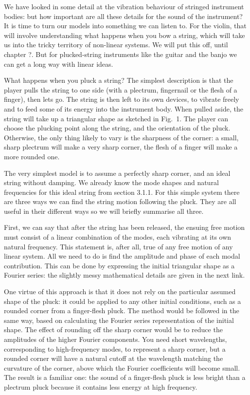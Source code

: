 

  We have looked in some detail at the vibration behaviour of stringed 
  instrument bodies: but how important are all these details for the sound of 
  the instrument? It is time to turn our models into something we can listen 
  to. For the violin, that will involve understanding what happens when you bow 
  a string, which will take us into the tricky territory of non-linear systems. 
  We will put this off, until chapter ?. But for plucked-string instruments 
  like the guitar and the banjo we can get a long way with linear ideas. 

  What happens when you pluck a string? The simplest description is that the 
  player pulls the string to one side (with a plectrum, fingernail or the flesh 
  of a finger), then lets go. The string is then left to its own devices, to 
  vibrate freely and to feed some of its energy into the instrument body. When 
  pulled aside, the string will take up a triangular shape as sketched in Fig.\ 
  1. The player can choose the plucking point along the string, and the 
  orientation of the pluck. Otherwise, the only thing likely to vary is the 
  sharpness of the corner: a small, sharp plectrum will make a very sharp 
  corner, the flesh of a finger will make a more rounded one. 

  The very simplest model is to assume a perfectly sharp corner, and an ideal 
  string without damping. We already know the mode shapes and natural 
  frequencies for this ideal string from section 3.1.1. For this simple system 
  there are three ways we can find the string motion following the pluck. They 
  are all useful in their different ways so we will briefly summarise all 
  three. 

  First, we can say that after the string has been released, the ensuing free 
  motion must consist of a linear combination of the modes, each vibrating at 
  its own natural frequency. This statement is, after all, true of any free 
  motion of any linear system. All we need to do is find the amplitude and 
  phase of each modal contribution. This can be done by expressing the initial 
  triangular shape as a Fourier series: the slightly messy mathematical details 
  are given in the next link. 

  One virtue of this approach is that it does not rely on the particular 
  assumed shape of the pluck: it could be applied to any other initial 
  conditions, such as a rounded corner from a finger-flesh pluck. The method 
  would be followed in the same way, based on calculating the Fourier series 
  representation of the initial shape. The effect of rounding off the sharp 
  corner would be to reduce the amplitudes of the higher Fourier components. 
  You need short wavelengths, corresponding to high-frequency modes, to 
  represent a sharp corner, but a rounded corner will have a natural cutoff at 
  the wavelength matching the curvature of the corner, above which the Fourier 
  coefficients will become small. The result is a familiar one: the sound of a 
  finger-flesh pluck is less bright than a plectrum pluck because it contains 
  less energy at high frequency. 

